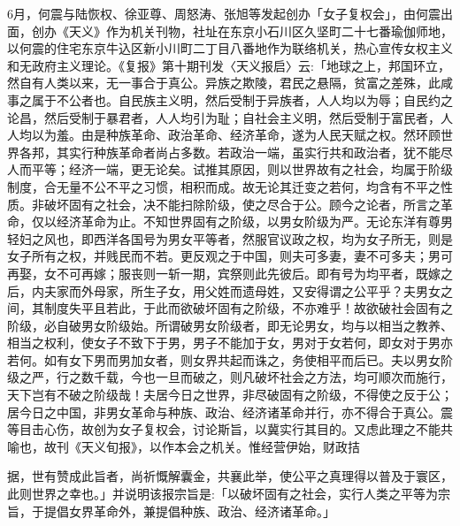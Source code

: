 6月，何震与陆恢权、徐亚尊、周怒涛、张旭等发起创办「女子复权会」，由何震出面，创办《天义》作为机关刊物，社址在东京小石川区久坚町二十七番瑜伽师地，以何震的住宅东京牛込区新小川町二丁目八番地作为联络机关，热心宣传女权主义和无政府主义理论。《复报》第十期刊发〈天义报启〉云:「地球之上，邦国环立，然自有人类以来，无一事合于真公。异族之欺陵，君民之悬隔，贫富之差殊，此咸事之属于不公者也。自民族主义明，然后受制于异族者，人人均以为辱；自民约之论昌，然后受制于暴君者，人人均引为耻；自社会主义明，然后受制于富民者，人人均以为羞。由是种族革命、政治革命、经济革命，遂为人民天赋之权。然环顾世界各邦，其实行种族革命者尚占多数。若政治一端，虽实行共和政治者，犹不能尽人而平等；经济一端，更无论矣。试推其原因，则以世界故有之社会，均属于阶级制度，合无量不公不平之习惯，相积而成。故无论其迁变之若何，均含有不平之性质。非破坏固有之社会，决不能扫除阶级，使之尽合于公。顾今之论者，所言之革命，仅以经济革命为止。不知世界固有之阶级，以男女阶级为严。无论东洋有尊男轻妇之风也，即西洋各国号为男女平等者，然服官议政之权，均为女子所无，则是女子所有之权，并贱民而不若。更反观之于中国，则夫可多妻，妻不可多夫；男可再娶，女不可再嫁；服丧则一斩一期，宾祭则此先彼后。即有号为均平者，既嫁之后，内夫家而外母家，所生子女，用父姓而遗母姓，又安得谓之公平乎？夫男女之间，其制度失平且若此，于此而欲破坏固有之阶级，不亦难乎！故欲破社会固有之阶级，必自破男女阶级始。所谓破男女阶级者，即无论男女，均与以相当之教养、相当之权利，使女子不致下于男，男子不能加于女，男对于女若何，即女对于男亦若何。如有女下男而男加女者，则女界共起而诛之，务使相平而后已。夫以男女阶级之严，行之数千载，今也一旦而破之，则凡破坏社会之方法，均可顺次而施行，天下岂有不破之阶级哉！夫居今日之世界，非尽破固有之阶级，不得使之反于公；居今日之中国，非男女革命与种族、政治、经济诸革命并行，亦不得合于真公。震等目击心伤，故创为女子复权会，讨论斯旨，以冀实行其目的。又虑此理之不能共喻也，故刊《天义旬报》，以作本会之机关。惟经营伊始，财政拮

\vfill
\begin{BookNotes}
\end{BookNotes}

\noindent 据，世有赞成此旨者，尚祈慨解囊金，共襄此举，使公平之真理得以普及于寰区，此则世界之幸也。」并说明该报宗旨是:「以破坏固有之社会，实行人类之平等为宗旨，于提倡女界革命外，兼提倡种族、政治、经济诸革命。」


